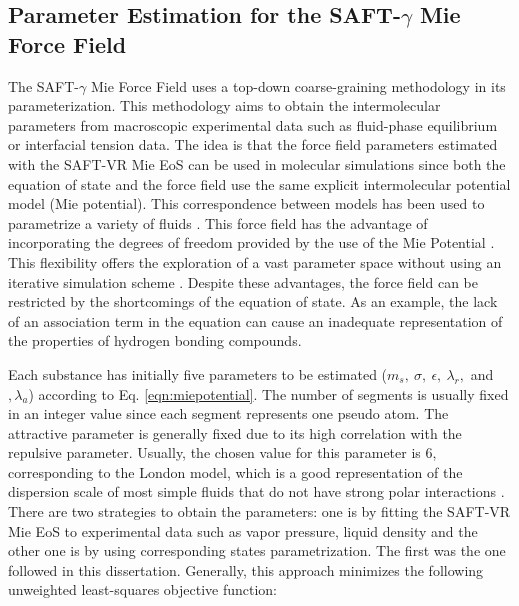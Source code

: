 \documentclass[
	12pt,				%
	openany,			%
	oneside,			%
	a4paper,			%
	english,			%
	brazil				%
	]{abntex2}
\begin{document}
\subsection{Parameter Estimation for the SAFT-$\gamma$ Mie Force Field}\label{parsaft}

The SAFT-$\gamma$ Mie Force Field uses a top-down coarse-graining methodology in its parameterization. This methodology aims to obtain the intermolecular parameters from macroscopic experimental data such as fluid-phase equilibrium or interfacial tension data. The idea is that the force field parameters estimated with the SAFT-VR Mie EoS can be used in molecular simulations since both the equation of state and the force field use the same explicit intermolecular potential model (Mie potential). This correspondence between models has been used to parametrize a variety of fluids \cite{ervik2016}. This force field has the advantage of incorporating the degrees of freedom provided by the use of the Mie Potential \cite{herdes2015}. This flexibility offers the exploration of a vast parameter space without using an iterative simulation scheme \cite{avendano2011}. Despite these advantages, the force field can be restricted by the shortcomings of the equation of state. As an example, the lack of an association term in the equation can cause an inadequate representation of the properties of hydrogen bonding compounds.

Each substance has initially five parameters to be estimated ($m_s,\ \sigma,\ \epsilon,\ \lambda_{r},$ and $, \lambda_{a}$) according to Eq. \eqref{eqn:miepotential}. The number of segments is usually fixed in an integer value since each segment represents one pseudo atom. The attractive parameter is generally  fixed due to its  high correlation with the repulsive parameter. Usually, the chosen value for this parameter is 6, corresponding to the London model, which is a good representation of the dispersion scale of most simple fluids that do not have strong polar interactions \cite{ramrattan2015,herdes2015}. There are two strategies to obtain the parameters: one is by fitting the SAFT-VR Mie EoS to experimental data such as vapor pressure, liquid density and the other one is by using corresponding states parametrization. The first was the one followed in this dissertation. Generally, this approach minimizes the following unweighted least-squares objective function:
\end{document}
